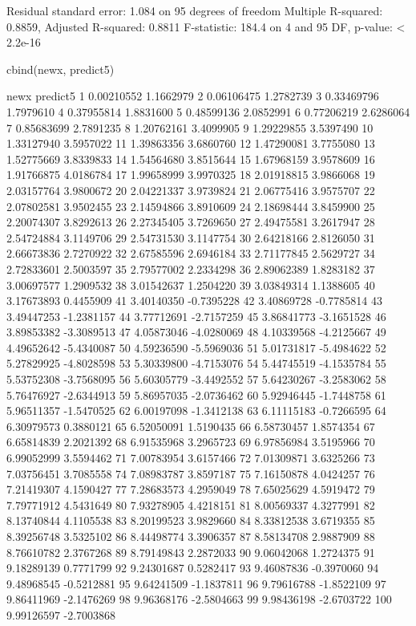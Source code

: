 \begin{Schunk}
\begin{Soutput}
Residual standard error: 1.084 on 95 degrees of freedom
Multiple R-squared: 0.8859,	Adjusted R-squared: 0.8811 
F-statistic: 184.4 on 4 and 95 DF,  p-value: < 2.2e-16 
\end{Soutput}
\begin{Sinput}
 cbind(newx, predict5)
\end{Sinput}
\begin{Soutput}
          newx   predict5
1   0.00210552  1.1662979
2   0.06106475  1.2782739
3   0.33469796  1.7979610
4   0.37955814  1.8831600
5   0.48599136  2.0852991
6   0.77206219  2.6286064
7   0.85683699  2.7891235
8   1.20762161  3.4099905
9   1.29229855  3.5397490
10  1.33127940  3.5957022
11  1.39863356  3.6860760
12  1.47290081  3.7755080
13  1.52775669  3.8339833
14  1.54564680  3.8515644
15  1.67968159  3.9578609
16  1.91766875  4.0186784
17  1.99658999  3.9970325
18  2.01918815  3.9866068
19  2.03157764  3.9800672
20  2.04221337  3.9739824
21  2.06775416  3.9575707
22  2.07802581  3.9502455
23  2.14594866  3.8910609
24  2.18698444  3.8459900
25  2.20074307  3.8292613
26  2.27345405  3.7269650
27  2.49475581  3.2617947
28  2.54724884  3.1149706
29  2.54731530  3.1147754
30  2.64218166  2.8126050
31  2.66673836  2.7270922
32  2.67585596  2.6946184
33  2.71177845  2.5629727
34  2.72833601  2.5003597
35  2.79577002  2.2334298
36  2.89062389  1.8283182
37  3.00697577  1.2909532
38  3.01542637  1.2504220
39  3.03849314  1.1388605
40  3.17673893  0.4455909
41  3.40140350 -0.7395228
42  3.40869728 -0.7785814
43  3.49447253 -1.2381157
44  3.77712691 -2.7157259
45  3.86841773 -3.1651528
46  3.89853382 -3.3089513
47  4.05873046 -4.0280069
48  4.10339568 -4.2125667
49  4.49652642 -5.4340087
50  4.59236590 -5.5969036
51  5.01731817 -5.4984622
52  5.27829925 -4.8028598
53  5.30339800 -4.7153076
54  5.44745519 -4.1535784
55  5.53752308 -3.7568095
56  5.60305779 -3.4492552
57  5.64230267 -3.2583062
58  5.76476927 -2.6344913
59  5.86957035 -2.0736462
60  5.92946445 -1.7448758
61  5.96511357 -1.5470525
62  6.00197098 -1.3412138
63  6.11115183 -0.7266595
64  6.30979573  0.3880121
65  6.52050091  1.5190435
66  6.58730457  1.8574354
67  6.65814839  2.2021392
68  6.91535968  3.2965723
69  6.97856984  3.5195966
70  6.99052999  3.5594462
71  7.00783954  3.6157466
72  7.01309871  3.6325266
73  7.03756451  3.7085558
74  7.08983787  3.8597187
75  7.16150878  4.0424257
76  7.21419307  4.1590427
77  7.28683573  4.2959049
78  7.65025629  4.5919472
79  7.79771912  4.5431649
80  7.93278905  4.4218151
81  8.00569337  4.3277991
82  8.13740844  4.1105538
83  8.20199523  3.9829660
84  8.33812538  3.6719355
85  8.39256748  3.5325102
86  8.44498774  3.3906357
87  8.58134708  2.9887909
88  8.76610782  2.3767268
89  8.79149843  2.2872033
90  9.06042068  1.2724375
91  9.18289139  0.7771799
92  9.24301687  0.5282417
93  9.46087836 -0.3970060
94  9.48968545 -0.5212881
95  9.64241509 -1.1837811
96  9.79616788 -1.8522109
97  9.86411969 -2.1476269
98  9.96368176 -2.5804663
99  9.98436198 -2.6703722
100 9.99126597 -2.7003868
\end{Soutput}
\end{Schunk}
